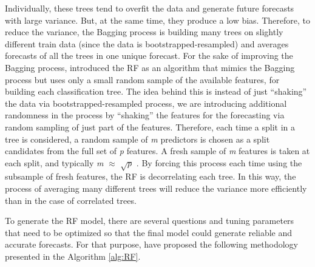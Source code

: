 \documentclass[preprint, 3p,
authoryear]{elsarticle} %
\begin{document}
Individually, these trees tend to overfit the data and generate future
forecasts with large variance. But, at the same time, they produce a low
bias. Therefore, to reduce the variance, the Bagging process is building
many trees on slightly different train data (since the data is
bootstrapped-resampled) and averages forecasts of all the trees in one
unique forecast. For the sake of improving the Bagging process,
\citet{breiman2001random} introduced the RF as an algorithm that mimics
the Bagging process but uses only a small random sample of the available
features, for building each classification tree. The idea behind this is
instead of just ``shaking'' the data via bootstrapped-resampled process,
we are introducing additional randomness in the process by ``shaking''
the features for the forecasting via random sampling of just part of the
features. Therefore, each time a split in a tree is considered, a random
sample of \emph{m} predictors is chosen as a split candidates from the
full set of \emph{p} features. A fresh sample of \emph{m} features is
taken at each split, and typically \emph{m} \(\approx\) \(\sqrt p\)
\citep{friedman2001elements}. By forcing this process each time using
the subsample of fresh features, the RF is decorrelating each tree. In
this way, the process of averaging many different trees will reduce the
variance more efficiently than in the case of correlated trees.

To generate the RF model, there are several questions and tuning
parameters that need to be optimized so that the final model could
generate reliable and accurate forecasts. For that purpose,
\citet{friedman2001elements} have proposed the following methodology
presented in the Algorithm \ref{alg:RF}.
\end{document}
